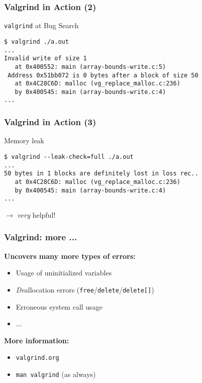 \begin{frame}[fragile]
  \frametitle{Valgrind in Action (2)}

  \begin{block}{\texttt{valgrind} at Bug Search}
\begin{verbatim}
$ valgrind ./a.out 
...
Invalid write of size 1
   at 0x400552: main (array-bounds-write.c:5)
 Address 0x51bb072 is 0 bytes after a block of size 50
   at 0x4C28C6D: malloc (vg_replace_malloc.c:236)
   by 0x400545: main (array-bounds-write.c:4)
...
\end{verbatim}
  \end{block}

\end{frame}

\begin{frame}[fragile]
  \frametitle{Valgrind in Action (3)}

  \begin{block}{Memory leak}
\begin{verbatim}
$ valgrind --leak-check=full ./a.out 
...
50 bytes in 1 blocks are definitely lost in loss rec..
   at 0x4C28C6D: malloc (vg_replace_malloc.c:236)
   by 0x400545: main (array-bounds-write.c:4)
...
\end{verbatim}
  \end{block}

  $\to$ \textit{very} helpful!

\end{frame}

\begin{frame}
  \frametitle{Valgrind: more ...}

  \textbf{Uncovers many more types of errors:}

  \begin{itemize}
  \item Usage of uninitialized variables
  \item \textit{De}allocation errors
    (\texttt{free}/\texttt{delete}/\texttt{delete[]})
  \item Erroneous system call usage
  \item ...
  \end{itemize}

  \textbf{More information:}
  \begin{itemize}
  \item \texttt{valgrind.org}
  \item \texttt{man valgrind} (as always)
  \end{itemize}

\end{frame}

